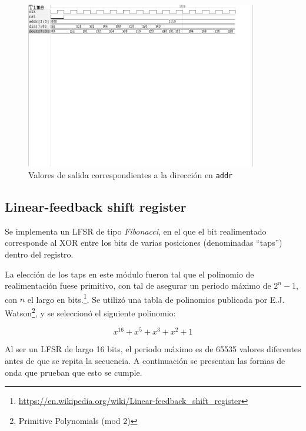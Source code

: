 \documentclass[letterpaper, 12pt]{article}
\numberwithin{equation}{section}
\begin{document}
\begin{figure}[H]
  \centering
  \includegraphics[width=0.9\textwidth]{../testbench/asr8/waves_asr8.pdf}
  \caption{Valores de salida correspondientes a la dirección en \texttt{addr}}
\end{figure}

\subsection{Linear-feedback shift register}

Se implementa un LFSR de tipo \emph{Fibonacci}, en el que el bit realimentado corresponde al XOR entre los bits de varias posiciones (denominadas ``taps'') dentro del registro.

La elección de los taps en este módulo fueron tal que el polinomio de realimentación fuese primitivo, con tal de asegurar un periodo máximo de \(2^n-1\), con \(n\) el largo en bits.\footnote{\url{https://en.wikipedia.org/wiki/Linear-feedback_shift_register}}. Se utilizó una tabla de polinomios publicada por E.J. Watson\footnote{Primitive Polynomials (mod 2)}, y se seleccionó el siguiente polinomio:

\begin{equation}
  x^{16}+x^{5}+x^{3}+x^{2}+1
\end{equation}

Al ser un LFSR de largo 16 bits, el periodo máximo es de 65535 valores diferentes antes de que se repita la secuencia. A continuación se presentan las formas de onda que prueban que esto se cumple.
\end{document}
